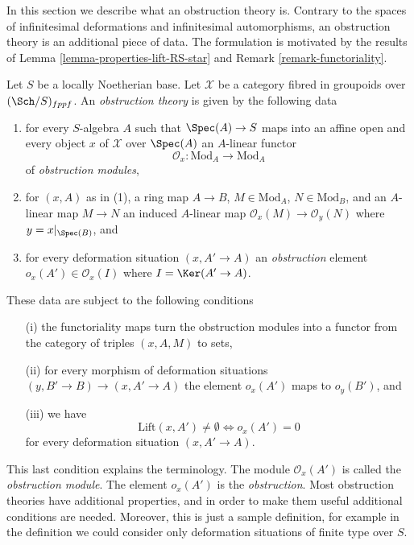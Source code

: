 \noindent
In this section we describe what an obstruction theory is.
Contrary to the spaces of infinitesimal deformations and infinitesimal
automorphisms, an obstruction theory is an additional piece of data.
The formulation is motivated by the results of
Lemma \ref{lemma-properties-lift-RS-star}
and Remark \ref{remark-functoriality}.

\begin{definition}
\label{definition-obstruction-theory}
Let $S$ be a locally Noetherian base. Let $\mathcal{X}$ be a category fibred
in groupoids over $(\Sch/S)_{fppf}$. An {\it obstruction theory} is 
given by the following data
\begin{enumerate}
\item for every $S$-algebra $A$ such that $\Spec(A) \to S$
maps into an affine open and every object $x$ of $\mathcal{X}$ over
$\Spec(A)$ an $A$-linear functor
$$
\mathcal{O}_x : \text{Mod}_A \to \text{Mod}_A
$$
of {\it obstruction modules},
\item for $(x, A)$ as in (1), a ring map $A \to B$,
$M \in \text{Mod}_A$, $N \in \text{Mod}_B$, and an $A$-linear
map $M \to N$ an induced $A$-linear map $\mathcal{O}_x(M) \to \mathcal{O}_y(N)$
where $y = x|_{\Spec(B)}$, and
\item for every deformation situation $(x, A' \to A)$ an
{\it obstruction} element
$o_x(A') \in \mathcal{O}_x(I)$ where $I = \Ker(A' \to A)$.
\end{enumerate}
These data are subject to the following conditions
\begin{enumerate}
\item[(i)] the functoriality maps turn the obstruction modules into a functor
from the category of triples $(x, A, M)$ to sets,
\item[(ii)] for every morphism of deformation situations
$(y, B' \to B) \to (x, A' \to A)$ the element $o_x(A')$ maps
to $o_y(B')$, and
\item[(iii)] we have
$$
\text{Lift}(x, A') \not = \emptyset
\Leftrightarrow
o_x(A') = 0
$$
for every deformation situation $(x, A' \to A)$.
\end{enumerate}
\end{definition}

\noindent
This last condition explains the terminology. The module $\mathcal{O}_x(A')$
is called the {\it obstruction module}. The element $o_x(A')$ is the
{\it obstruction}.
Most obstruction theories have additional properties, and in order to
make them useful additional conditions are needed.
Moreover, this is just a sample definition, for example in the definition
we could consider only deformation situations of finite type over $S$.

